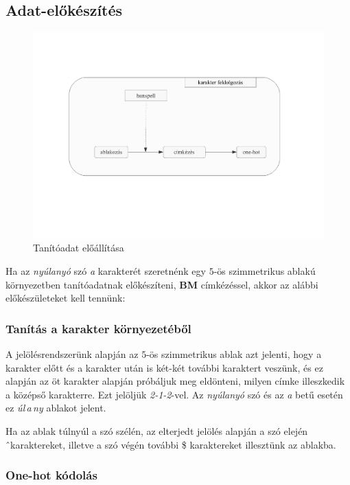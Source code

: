 \documentclass[a4paper, magyar]{article}
\begin{document}
\subsection{Adat-előkészítés}
\begin{figure}[htp]
	\includegraphics[trim={0 6cm 0 4cm},clip,
	width=\textwidth]{figures/characters.pdf}
	\caption{Tanítóadat előállítása}\par\medskip\centering
	\label{fig:char}
\end{figure}
Ha az \textit{nyúlanyó} szó \textit{a} karakterét szeretnénk egy $5$-ös szimmetrikus ablakú környezetben tanítóadatnak előkészíteni, \textbf{BM} címkézéssel, akkor az alábbi előkészületeket kell tennünk:
\subsubsection{Tanítás a karakter környezetéből}

A jelölésrendszerünk alapján az $5$-ös szimmetrikus ablak azt jelenti, hogy a karakter előtt és a karakter után is két-két további karaktert veszünk, és ez alapján az öt karakter alapján próbáljuk meg eldönteni, milyen címke illeszkedik a középső karakterre. Ezt jelöljük \textit{2-1-2}-vel. Az \textit{nyúlanyó} szó és az \textit{a} betű esetén ez \textit{úl\,a\,ny} ablakot jelent.

Ha az ablak túlnyúl a szó szélén, az elterjedt jelölés alapján a szó elején \^\ karaktereket, illetve a szó végén további \$ karaktereket illesztünk az ablakba.
\subsubsection{One-hot kódolás}
\end{document}
